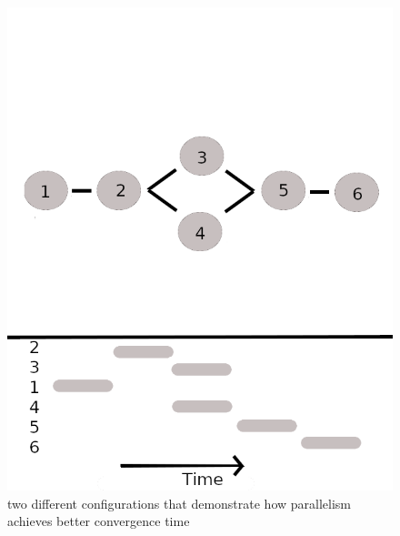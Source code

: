 \documentclass[12pt,notitlepage]{article}
\begin{document}
\begin{figure}
\begin{minipage}{.5\linewidth}
\includegraphics[scale=0.3]{img/fig1b.png}
\end{minipage}
\caption{two different configurations that demonstrate how parallelism achieves
better convergence time} 
\end{figure}
\end{document}
